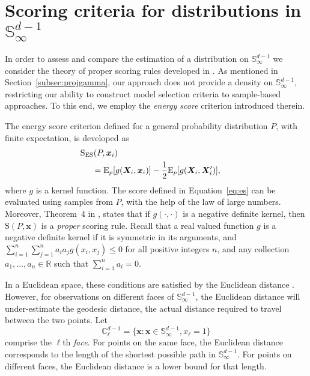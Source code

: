 \section{Scoring criteria for distributions in ${\mathbb S}_\infty^{d-1}$\label{sec:evaluation}}

In order to assess and compare the estimation of a distribution on ${\mathbb S}_\infty^{d-1}$ we consider 
    the theory of proper scoring rules developed in \cite{gneiting2007}. As mentioned in 
    Section~\ref{subsec:projgamma}, our approach does not provide a density on 
    ${\mathbb S}_{\infty}^{d-1}$, restricting our ability to construct model selection criteria 
    to sample-based approaches.  To this end, we employ the \emph{energy score} criterion introduced
    therein.

The energy score criterion defined for a general probability distribution $P$, with finite expectation, 
    is developed as
    \begin{equation}
    \label{eq:es}
    \begin{aligned}
    &\hspace{-0.5cm}\text{S}_{\text{ES}}\left(P, \bm{x}_i\right) \\
    &=\text{E}_p \left[g\left(\bm{X}_i, \bm{x}_i\right)\right] -
                                    \frac{1}{2}\text{E}_p \left[g\left(\bm{X}_i,\bm{X}_i^{\prime}\right)\right],
    \end{aligned}
    \end{equation}
where $g$ is a kernel function. The score defined in Equation~\eqref{eq:es} can be evaluated
  using samples from $P$, with the help of the law of large numbers.
  Moreover, Theorem~4 in \cite{gneiting2007}, states that if $g(\cdot,\cdot)$ is a negative 
  definite kernel, then $\text{S}(P,\bm{x})$ is a \emph{proper} scoring rule.  Recall that a 
  real valued function $g$ is a negative definite kernel if it is symmetric in its arguments, 
  and $\sum_{i=1}^n\sum_{j=1}^na_ia_jg(x_i,x_j)\leq 0$ for all positive integers $n$, and any 
  collection $a_1,\ldots,a_n\in{\mathbb R}$ such that  $\sum_{i = 1}^na_i = 0$.  

In a Euclidean space, these conditions are satisfied by the Euclidean distance \citep{berg1984}. 
    However, for observations on different faces of ${\mathbb S}_{\infty}^{d-1}$, the Euclidean 
    distance will under-estimate the geodesic distance, the actual distance required to travel 
    between the two points.  Let
\begin{equation*}
    {\mathbb C}_{\ell}^{d-1} = \lbrace \bm{x} : \bm{x} \in {\mathbb S}_{\infty}^{d-1}, x_{\ell} = 1\rbrace
\end{equation*}
    comprise the $\ell$th \emph{face}.  For points on the same face, the Euclidean distance 
    corresponds to the length of the shortest possible path in ${\mathbb S}_{\infty}^{d-1}$.  
    For points on different faces, the Euclidean distance is a lower bound for that length.

